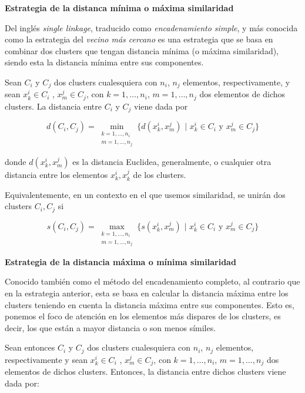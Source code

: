 \textbf{Estrategia de la distanca mínima o máxima similaridad} \newline

Del inglés \textit{single linkage}, traducido como \textit{encadenamiento simple}, y más conocida como la estrategia del \textit{vecino más cercano} es una estrategia que
se basa en combinar dos clusters que tengan distancia mínima (o máxima similaridad), siendo esta la distancia mínima entre sus componentes. \newline

Sean $C_{i}$ y $C_{j}$ dos clusters cualesquiera con $n_{i}$, $n_{j}$ elementos, respectivamente, y sean $x^{i}_{k} \in C_{i}$ , $x^{j}_{m} \in C_{j}$, con $k=1,\dots,n_{i}$, $m=1,\dots,n_{j}$ dos elementos de dichos clusters. La 
distancia entre $C_{i}$ y $C_{j}$ viene dada por

\[
d(C_{i},C_{j}) = \min_{\substack{k=1,\dots,n_{i} \\ m=1,\dots,n_{j}}}\{d(x^{i}_{k},x^{j}_{m}) \text{ | } x^{i}_{k} \in C_{i} \text{ y } x^{j}_{m} \in C_{j}\}
\]

donde $d(x^{i}_{k},x^{j}_{m})$ es la distancia Euclidea, generalmente, o cualquier otra distancia entre los elementos $x^{i}_{k},x^{j}_{k}$ de los clusters. 

Equivalentemente, en un contexto en el que usemos similaridad, se unirán dos clusters $C_{i}, C_{j}$ si

\[
s(C_{i},C_{j}) = \max_{\substack{k=1,\dots,n_{i} \\ m=1,\dots,n_{j}}}\{s(x^{i}_{k},x^{j}_{m}) \text{ | } x^{i}_{k} \in C_{i} \text{ y } x^{j}_{m} \in C_{j}\}
\]

\textbf{Estrategia de la distancia máxima o mínima similaridad}

Conocido también como el método del encadenamiento completo, al contrario que en la estrategia anterior, esta se basa en calcular la distancia máxima 
entre los clusters teniendo en cuenta la distancia máxima entre sus componentes. Esto es, ponemos el foco de atención en los elementos más dispares de 
los clusters, es decir, los que están a mayor distancia o son menos símiles. \newline

Sean entonces $C_{i}$ y $C_{j}$ dos clusters cualesquiera con $n_{i}$, $n_{j}$ elementos, respectivamente y sean $x^{i}_{k} \in C_{i}$ , $x^{j}_{m} \in C_{j}$, 
con $k=1,\dots,n_{i}$, $m=1,\dots,n_{j}$ dos elementos de dichos clusters. Entonces, la distancia entre dichos clusters viene dada por:

